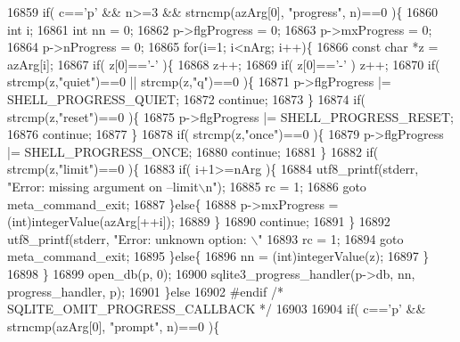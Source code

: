 \begin{DoxyCode}
{{{{{{{{{{{{{{{{{{{{{{{{{{{{{{{{{{{{{{{{{{{{{{{{{{{{{{{{{{{{{{{{{{{{{{{16859   \textcolor{keywordflow}{if}( c==\textcolor{charliteral}{'p'} && n>=3 && strncmp(azArg[0], \textcolor{stringliteral}{"progress"}, n)==0 )\{
16860     \textcolor{keywordtype}{int} i;
16861     \textcolor{keywordtype}{int} nn = 0;
16862     p->flgProgress = 0;
16863     p->mxProgress = 0;
16864     p->nProgress = 0;
16865     \textcolor{keywordflow}{for}(i=1; i<nArg; i++)\{
16866       \textcolor{keyword}{const} \textcolor{keywordtype}{char} *z = azArg[i];
16867       \textcolor{keywordflow}{if}( z[0]==\textcolor{charliteral}{'-'} )\{
16868         z++;
16869         \textcolor{keywordflow}{if}( z[0]==\textcolor{charliteral}{'-'} ) z++;
16870         \textcolor{keywordflow}{if}( strcmp(z,\textcolor{stringliteral}{"quiet"})==0 || strcmp(z,\textcolor{stringliteral}{"q"})==0 )\{
16871           p->flgProgress |= SHELL_PROGRESS_QUIET;
16872           \textcolor{keywordflow}{continue};
16873         \}
16874         \textcolor{keywordflow}{if}( strcmp(z,\textcolor{stringliteral}{"reset"})==0 )\{
16875           p->flgProgress |= SHELL_PROGRESS_RESET;
16876           \textcolor{keywordflow}{continue};
16877         \}
16878         \textcolor{keywordflow}{if}( strcmp(z,\textcolor{stringliteral}{"once"})==0 )\{
16879           p->flgProgress |= SHELL_PROGRESS_ONCE;
16880           \textcolor{keywordflow}{continue};
16881         \}
16882         \textcolor{keywordflow}{if}( strcmp(z,\textcolor{stringliteral}{"limit"})==0 )\{
16883           \textcolor{keywordflow}{if}( i+1>=nArg )\{
16884             utf8_printf(stderr, \textcolor{stringliteral}{"Error: missing argument on --limit\(\backslash\)n"});
16885             rc = 1;
16886             \textcolor{keywordflow}{goto} meta\_command\_exit;
16887           \}\textcolor{keywordflow}{else}\{
16888             p->mxProgress = (int)integerValue(azArg[++i]);
16889           \}
16890           \textcolor{keywordflow}{continue};
16891         \}
16892         utf8_printf(stderr, \textcolor{stringliteral}{"Error: unknown option: \(\backslash\)"%
16893         rc = 1;
16894         \textcolor{keywordflow}{goto} meta\_command\_exit;
16895       \}\textcolor{keywordflow}{else}\{
16896         nn = (int)integerValue(z);
16897       \}
16898     \}
16899     open_db(p, 0);
16900     sqlite3_progress_handler(p->db, nn, progress_handler, p);
16901   \}\textcolor{keywordflow}{else}
16902 \textcolor{preprocessor}{#endif }\textcolor{comment}{/* SQLITE\_OMIT\_PROGRESS\_CALLBACK */}\textcolor{preprocessor}{}
16903 
16904   \textcolor{keywordflow}{if}( c==\textcolor{charliteral}{'p'} && strncmp(azArg[0], \textcolor{stringliteral}{"prompt"}, n)==0 )\{
}}}}}}}}}}}}}}}}}}}}}}}}}}}}}}}}}}}}}}}}}}}}}}}}}}}}}}}}}}}}}}}}}}}}}}}}
\end{DoxyCode}
